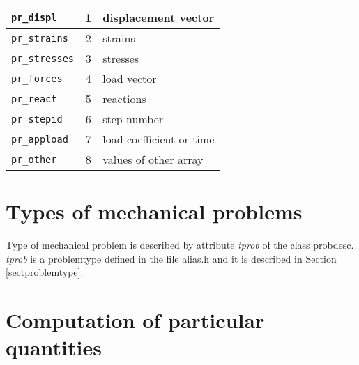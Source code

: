 \begin{center}
\begin{tabular}{|l|c|l|}
\hline
{\tt pr\_displ} & 1 & displacement vector
\\ \hline
{\tt pr\_strains} & 2 & strains
\\ \hline
{\tt pr\_stresses} & 3 & stresses
\\ \hline
{\tt pr\_forces} & 4 & load vector
\\ \hline
{\tt pr\_react} & 5 & reactions
\\ \hline
{\tt pr\_stepid} & 6 & step number
\\ \hline
{\tt pr\_appload} & 7 & load coefficient or time
\\ \hline
{\tt pr\_other} & 8 & values of other array
\\ \hline
\end{tabular}
\end{center}

\section{Types of mechanical problems}
Type of mechanical problem is described by attribute {\it tprob} of the class {\sf probdesc}. {\it tprob}
is a {\sf problemtype} defined in the file alias.h and it is described in Section \ref{sectproblemtype}.

\section{Computation of particular quantities}

